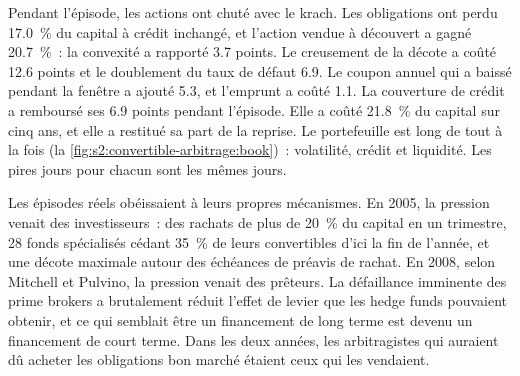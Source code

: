 Pendant l'épisode, les actions ont chuté avec le krach. Les obligations ont perdu 17.0~\% du capital à crédit inchangé, et l'action vendue à découvert a gagné 20.7~\%~: la
convexité a rapporté 3.7 points. Le creusement de la décote a coûté 12.6 points et le doublement du taux de défaut 6.9. Le coupon annuel qui a baissé pendant la fenêtre a ajouté 5.3, et
l'emprunt a coûté 1.1. La couverture de crédit a remboursé ses 6.9 points pendant l'épisode. Elle a coûté 21.8~\% du capital sur cinq ans, et elle a restitué sa part de
la reprise. Le portefeuille est long de tout à la fois (la \cref{fig:s2:convertible-arbitrage:book})~: volatilité, crédit et liquidité. Les pires jours pour chacun
sont les mêmes jours.

\begin{omfigure}

\label{fig:s2:convertible-arbitrage:book}
\end{omfigure}

Les épisodes réels obéissaient à leurs propres mécanismes. En 2005, la pression venait des investisseurs~: des rachats de plus de 20~\% du capital en un trimestre, 28
fonds spécialisés cédant 35~\% de leurs convertibles d'ici la fin de l'année, et une décote maximale autour des échéances de préavis de rachat. En
2008, selon Mitchell et Pulvino, la pression venait des prêteurs. La défaillance imminente des prime brokers a brutalement réduit l'effet de levier que les hedge funds
pouvaient obtenir, et ce qui semblait être un financement de long terme est devenu un financement de court terme. Dans les deux années, les arbitragistes qui auraient dû acheter les obligations bon marché étaient
ceux qui les vendaient.

